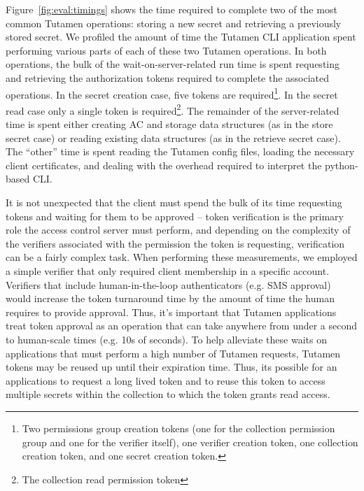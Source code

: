 Figure~\ref{fig:eval:timings} shows the time required to complete two
of the most common Tutamen operations: storing a new secret and
retrieving a previously stored secret. We profiled the amount of time
the Tutamen CLI application spent performing various parts of each of
these two Tutamen operations. In both operations, the bulk of the
wait-on-server-related run time is spent requesting and retrieving the
authorization tokens required to complete the associated
operations. In the secret creation case, five tokens are
required\footnote{Two permissions group creation tokens (one for the
  collection permission group and one for the verifier itself), one
  verifier creation token, one collection creation token, and one
  secret creation token.}. In the secret read case only a single token
is required\footnote{The collection read permission token}. The
remainder of the server-related time is spent either creating AC and
storage data structures (as in the store secret case) or reading
existing data structures (as in the retrieve secret case). The
``other'' time is spent reading the Tutamen config files, loading the
necessary client certificates, and dealing with the overhead required
to interpret the python-based CLI.

It is not unexpected that the client must spend the bulk of its time
requesting tokens and waiting for them to be approved -- token
verification is the primary role the access control server must
perform, and depending on the complexity of the verifiers associated
with the permission the token is requesting, verification can be a
fairly complex task. When performing these measurements, we employed a
simple verifier that only required client membership in a specific
account. Verifiers that include human-in-the-loop authenticators
(e.g. SMS approval) would increase the token turnaround time by the
amount of time the human requires to provide approval. Thus, it's
important that Tutamen applications treat token approval as an
operation that can take anywhere from under a second to human-scale
times (e.g. 10s of seconds). To help alleviate these waits on
applications that must perform a high number of Tutamen requests,
Tutamen tokens may be reused up until their expiration time. Thus, its
possible for an applications to request a long lived token and to
reuse this token to access multiple secrets within the collection to
which the token grants read access.
 
